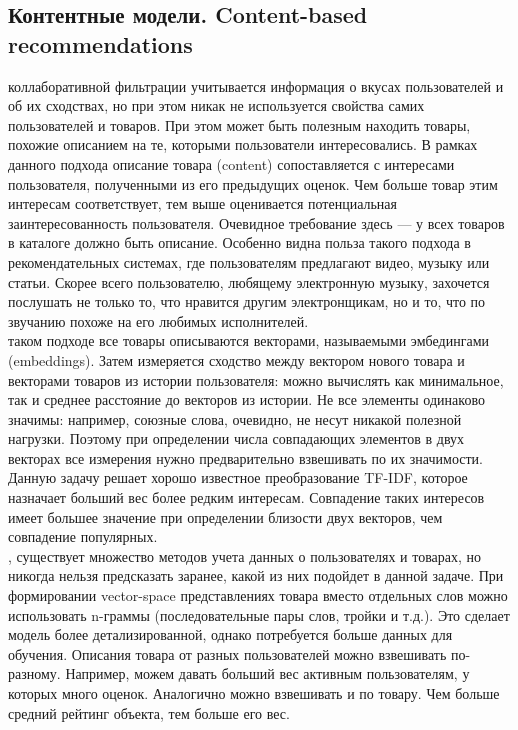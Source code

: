 \documentclass{article}
\newcommand\tab[1][1cm]{\hspace*{#1}}
\begin{document}
\subsection{Контентные модели. Content-based recommendations}
 коллаборативной фильтрации учитывается информация о вкусах пользователей и об их сходствах, но при этом никак не используется свойства самих пользователей и товаров. При этом может быть полезным находить товары, похожие описанием на те, которыми пользователи интересовались. В рамках данного подхода описание товара (content) сопоставляется с интересами пользователя, полученными из его предыдущих оценок. Чем больше товар этим интересам соответствует, тем выше оценивается потенциальная заинтересованность пользователя. Очевидное требование здесь — у всех товаров в каталоге должно быть описание. Особенно видна польза такого подхода в рекомендательных системах, где пользователям предлагают видео, музыку или статьи. Скорее всего пользователю, любящему электронную музыку, захочется послушать не только то, что нравится другим электронщикам, но и то, что по звучанию похоже на его любимых исполнителей. \\
 таком подходе все товары описываются векторами, называемыми эмбедингами (embeddings). Затем измеряется сходство между вектором нового товара и векторами товаров из истории пользователя: можно вычислять как минимальное, так и среднее расстояние до векторов из истории. Не все элементы одинаково значимы: например, союзные слова, очевидно, не несут никакой полезной нагрузки. Поэтому при определении числа совпадающих элементов в двух векторах все измерения нужно предварительно взвешивать по их значимости. Данную задачу решает хорошо известное преобразование TF-IDF, которое назначает больший вес более редким интересам. Совпадение таких интересов имеет большее значение при определении близости двух векторов, чем совпадение популярных.\\
, существует множество методов учета данных о пользователях и товарах, но никогда нельзя предсказать заранее, какой из них подойдет в данной задаче. При формировании vector-space представлениях товара вместо отдельных слов можно использовать n-граммы (последовательные пары слов, тройки и т.д.). Это сделает модель более детализированной, однако потребуется больше данных для обучения. Описания товара от разных пользователей можно взвешивать по-разному. Например, можем давать больший вес активным пользователям, у которых много оценок. Аналогично можно взвешивать и по товару. Чем больше средний рейтинг объекта, тем больше его вес.
\newpage
\end{document}
